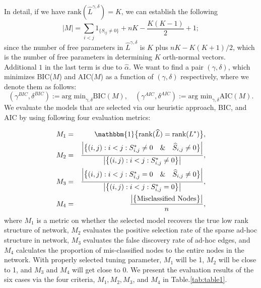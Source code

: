 \documentclass[AMS,STIX1COL]{WileyNJD-v2}
\begin{document}
{In detail, if we have $\text{rank}(\widehat{L}^{\gamma,\delta})=K$, we can establish the following
\[
|M| = \sum_{i < j}1_{\{S_{ij} \neq 0\}} + n K - \frac{K(K-1)}{2} + 1 ;
\]
since the number of free parameters in $\widehat{L}^{\gamma,\delta}$ is $K$ plus $nK - K(K+1)/2$, which is the number of free parameters in determining $K$ orth-normal vectors.
Additional $1$ in the last term is due to $\hat{\alpha}$.
We want to find a pair $(\gamma,\delta)$, which minimizes BIC($M$) and AIC($M$) as a function of $(\gamma,\delta)$ respectively, where we denote them as follows:
\[
    (\gamma^{BIC},\delta^{BIC}):= \mbox{arg min}_{\gamma, \delta}
    \mbox{BIC}(M),
    \quad
    (\gamma^{AIC},\delta^{AIC}):= \mbox{arg min}_{\gamma, \delta}
    \mbox{AIC}(M).
\]
We evaluate the models that are selected via our heuristic approach, BIC, and AIC by using following four evaluation metrics:

\begin{eqnarray*}
M_1 &=& \mathbbm{1}\big\{\mbox{rank}(\widehat{L}) = \mbox{rank}(L^{*})\big\}, \\
M_2 &=& \frac{\left|\big\{(i,j):i<j:S^{*}_{i,j} \neq0 \quad \& \quad \widehat{S}_{i,j} \neq 0 \big\}\right|}{\left|\big\{(i,j):i<j:S^{*}_{i,j}\neq0\big\}\right|}, \\
M_3 &=& \frac{\left|\big\{(i,j):i<j:S^{*}_{i,j} = 0 \quad \& \quad \widehat{S}_{i,j} \neq 0 \big\}\right|}{\left|\big\{(i,j):i<j:S^{*}_{i,j}=0\big\}\right|}, \\
M_4 &=& \frac{\left|\big\{\mbox{Misclassified Nodes}\big\}\right|}{n},
\end{eqnarray*}
where $M_1$ is a metric on whether the selected model recovers the true low rank structure of network,
$M_2$ evaluates the positive selection rate of the sparse ad-hoc structure in network,
$M_3$ evaluates the false discovery rate of ad-hoc edges, and
$M_4$ calculates the proportion of mis-classified nodes to the entire nodes in the network.
With properly selected tuning parameter, $M_1$ will be 1, $M_2$ will be close to 1, and $M_3$ and $M_4$ will get close to 0.
We present the evaluation results of the six cases via the four criteria, $M_1,M_2,M_3$, and $M_4$ in Table.\ref{tab:table1}.

}
\end{document}
